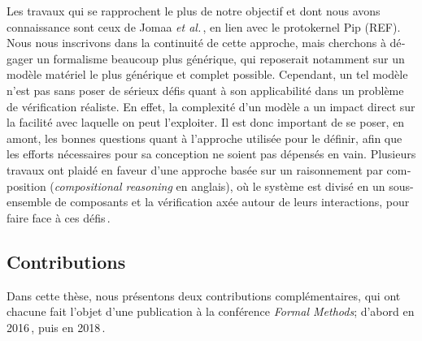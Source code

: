 \begin{otherlanguage}{french}
  Les travaux qui se rapprochent le plus de notre objectif et dont nous avons
  connaissance sont ceux de Jomaa \emph{et al.}\,\cite{jomaa2016mmu}, en lien
  avec le protokernel Pip (REF).
  Nous nous inscrivons dans la continuité de cette approche, mais cherchons à
  dégager un formalisme beaucoup plus générique, qui reposerait notamment sur un
  modèle matériel le plus générique et complet possible.
  Cependant, un tel modèle n’est pas sans poser de sérieux défis quant à son
  applicabilité dans un problème de vérification réaliste.
  En effet, la complexité d’un modèle a un impact direct sur la facilité avec
  laquelle on peut l’exploiter.
  Il est donc important de se poser, en amont, les bonnes questions quant à
  l’approche utilisée pour le définir, afin que les efforts nécessaires pour sa
  conception ne soient pas dépensés en vain.
  Plusieurs travaux ont plaidé en faveur d’une approche basée sur un
  raisonnement par composition (\emph{compositional reasoning} en anglais), où
  le système est divisé en un sous-ensemble de composants et la vérification
  axée autour de leurs interactions, pour faire face à ces
  défis\,\cite{garg2010compositional,heyman2012securemodel}.

  \subsection*{Contributions}

  Dans cette thèse, nous présentons deux contributions complémentaires, qui ont
  chacune fait l’objet d’une publication à la conférence \emph{Formal Methods};
  d’abord en 2016\,\cite{letan2016speccert}, puis en
  2018\,\cite{letan2018freespec}.


\end{otherlanguage}
